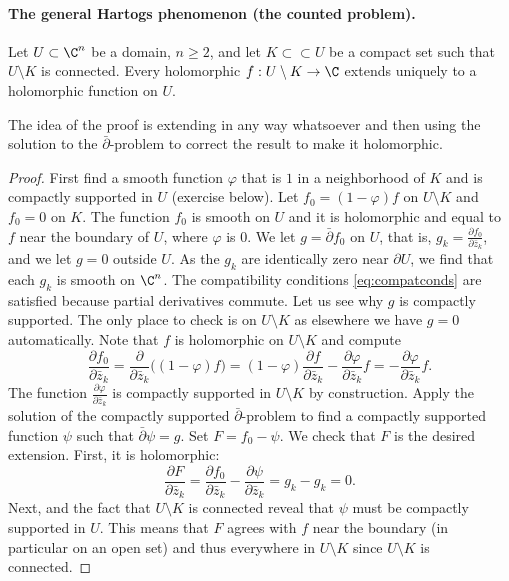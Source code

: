 \paragraph{The general Hartogs phenomenon (the counted problem).}
\begin{thm}
Let $U\subset\C^n$ be a domain, $n\geq2$, and let $K\subset\subset U$ be a compact set such that $U\setminus K$ is connected. Every holomorphic $f:U\setminus K\to\C$ extends uniquely to a holomorphic function on $U$.
\end{thm}
The idea of the proof is extending in any way whatsoever and then using the solution to the $\bar\partial$-problem to correct the result to make it holomorphic.
\begin{proof}
First find a smooth function $\varphi$ that is $1$ in a neighborhood of $K$ and is compactly supported in $U$ (exercise below). Let $f_0=(1-\varphi)f$ on $U\setminus K$ and $f_0=0$ on $K$. The function $f_0$ is smooth on $U$ and it is holomorphic and equal to $f$ near the boundary of $U$, where $\varphi$ is $0$. We let $g=\bar\partial f_0$ on $U$, that is, $g_k=\frac{\partial f_0}{\partial\bar z_k}$, and we let $g=0$ outside $U$. As the $g_k$ are identically zero near $\partial U$, we find that each $g_k$ is smooth on $\C^n$. The compatibility conditions \eqref{eq:compatconds} are satisfied because partial derivatives commute. Let us see why $g$ is compactly supported. The only place to check is on $U\setminus K$ as elsewhere we have $g=0$ automatically. Note that $f$ is holomorphic on $U\setminus K$ and compute
\[
\frac{\partial f_0}{\partial\bar z_k}
=\frac{\partial}{\partial\bar z_k}\bigl((1-\varphi)f\bigr)
=(1-\varphi)\frac{\partial f}{\partial\bar z_k}-\frac{\partial\varphi}{\partial\bar z_k}f
=-\frac{\partial\varphi}{\partial\bar z_k}f.
\]
The function $\frac{\partial\varphi}{\partial\bar z_k}$ is compactly supported in $U\setminus K$ by construction. Apply the solution of the compactly supported $\bar\partial$-problem to find a compactly supported function $\psi$ such that $\bar\partial\psi=g$. Set $F=f_0-\psi$. We check that $F$ is the desired extension. First, it is holomorphic:
\[
\frac{\partial F}{\partial\bar z_k}=\frac{\partial f_0}{\partial\bar z_k}-\frac{\partial\psi}{\partial\bar z_k}=g_k-g_k=0.
\]
Next,  and the fact that $U\setminus K$ is connected reveal that $\psi$ must be compactly supported in $U$. This means that $F$ agrees with $f$ near the boundary (in particular on an open set) and thus everywhere in $U\setminus K$ since $U\setminus K$ is connected.
\end{proof}
